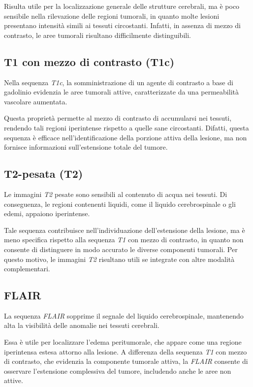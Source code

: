 Risulta utile per la localizzazione generale delle strutture cerebrali, ma è poco sensibile nella rilevazione delle regioni tumorali, in quanto molte lesioni presentano intensità simili ai tessuti circostanti. Infatti, in assenza di mezzo di contrasto, le aree tumorali risultano difficilmente distinguibili.

\subsection{T1 con mezzo di contrasto (T1c)}
Nella sequenza \textit{T1c}, la somministrazione di un agente di contrasto a base di gadolinio evidenzia le aree tumorali attive, caratterizzate da una permeabilità vascolare aumentata.

Questa proprietà permette al mezzo di contrasto di accumularsi nei tessuti, rendendo tali regioni iperintense rispetto a quelle sane circostanti. Difatti, questa sequenza è efficace nell’identificazione della porzione attiva della lesione, ma non fornisce informazioni sull’estensione totale del tumore.

\subsection{T2-pesata (T2)}
Le immagini \textit{T2} pesate sono sensibili al contenuto di acqua nei tessuti. Di conseguenza, le regioni contenenti liquidi, come il liquido cerebrospinale o gli edemi, appaiono iperintense.

Tale sequenza contribuisce nell'individuazione dell’estensione della lesione, ma è meno specifica rispetto alla sequenza \textit{T1} con mezzo di contrasto, in quanto non consente di distinguere in modo accurato le diverse componenti tumorali. Per questo motivo, le immagini \textit{T2} risultano utili se integrate con altre modalità complementari.

\subsection{FLAIR}
La sequenza \textit{FLAIR} sopprime il segnale del liquido cerebrospinale, mantenendo alta la visibilità delle anomalie nei tessuti cerebrali.

Essa è utile per localizzare l’edema peritumorale, che appare come una regione iperintensa estesa attorno alla lesione. A differenza della sequenza \textit{T1} con mezzo di contrasto, che evidenzia la componente tumorale attiva, la \textit{FLAIR} consente di osservare l’estensione complessiva del tumore, includendo anche le aree non attive.

